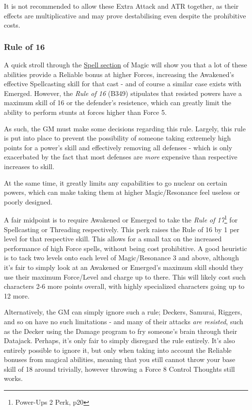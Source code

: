 \begin{multicols*}{3}
	It is not recommended to allow these Extra Attack and ATR together, as their effects are multiplicative and may prove destabilising even despite the prohibitive costs.
	
	\subsubsection{Rule of 16}
	
	A quick stroll through the \hyperref[spells]{Spell section} of Magic will show you that a lot of these abilities provide a Reliable bonus at higher Forces, increasing the Awakened's effective Spellcasting skill for that cast - and of course a similar case exists with Emerged. However, the \textit{Rule of 16} (B349) stipulates that resisted powers have a maximum skill of 16 or the defender's resistence, which can greatly limit the ability to perform stunts at forces higher than Force 5.
	
	As such, the GM must make some decisions regarding this rule. Largely, this rule is put into place to prevent the possibility of someone taking extremely high points for a power's skill and effectively removing all defenses - which is only exacerbated by the fact that most defenses are \textit{more} expensive than respective increases to skill.
	
	At the same time, it greatly limits any capabilities to go nuclear on certain powers, which can make taking them at higher Magic/Resonance feel useless or poorly designed.
	
	A fair midpoint is to require Awakened or Emerged to take the \textit{Rule of 17}\footnote{Power-Ups 2 Perk, p20} for Spellcasting or Threading respectively. This perk raises the Rule of 16 by 1 per level for that respective skill. This allows for a small tax on the increased performance of high Force spells, without being cost prohibitive. A good heuristic is to tack two levels onto each level of Magic/Resonance 3 and above, although it's fair to simply look at an Awakened or Emerged's maximum skill should they use their maximum Force/Level and charge up to there. This will likely cost such characters 2-6 more points overall, with highly specialized characters going up to 12 more.
	
	Alternatively, the GM can simply ignore such a rule; Deckers, Samurai, Riggers, and so on have no such limitations - and many of their attacks \textit{are resisted}, such as the Decker using the Damage program to fry someone's brain through their Datajack. Perhaps, it's only fair to simply disregard the rule entirely. It's also entirely possible to ignore it, but only when taking into account the Reliable bonuses from magical abilities, meaning that you still cannot throw your base skill of 18 around trivially, however throwing a Force 8 Control Thoughts still works.
	
\end{multicols*}